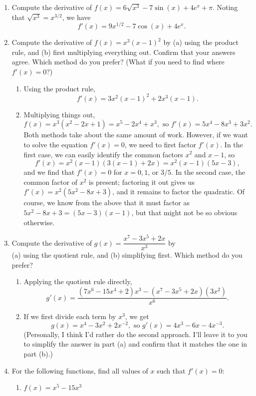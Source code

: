 \documentclass[12pt]{article}
\begin{document}
\begin{enumerate}
    \item Compute the derivative of $f(x) = 6\sqrt{x^3}-7\sin(x)+4e^x +\pi.$
    Noting that $\sqrt{x^3} = x^{3/2}$, we have
    \[
    f'(x) = 9x^{1/2}-7\cos(x)+4e^x.
    \]
    
    
    
    \item Compute the derivative of $f(x)=x^3(x-1)^2$ by (a) using the product rule, and (b) first multiplying everything out. Confirm that your answers agree. Which method do you prefer? (What if you need to find where $f'(x)=0$?)
    
   \begin{enumerate}
   \item Using the product rule,
   \[
   f'(x) = 3x^2(x-1)^2+2x^3(x-1).
   \]
   \item Multiplying things out,
   \[
   f(x) = x^3(x^2-2x+1)=x^5-2x^4+x^3, \text{ so } f'(x) = 5x^4-8x^3+3x^2.
   \]
   Both methods take about the same amount of work. However, if we want to solve the equation $f'(x)=0$, we need to first factor $f'(x)$. In the first case, we can easily identify the common factors $x^2$ and $x-1$, so
   \[
   f'(x) = x^2(x-1)(3(x-1)+2x) = x^2(x-1)(5x-3),
   \]
   and we find that $f'(x)=0$ for $x=0, 1$, or $3/5$.
   In the second case, the common factor of $x^2$ is present; factoring it out gives us $f'(x) = x^2(5x^2-8x+3)$, and it remains to factor the quadratic. Of course, we know from the above that it must factor as $5x^2-8x+3=(5x-3)(x-1)$, but that might not be so obvious otherwise.
   \end{enumerate}
    
    \item Compute the derivative of $g(x) = \dfrac{x^7-3x^5+2x}{x^3}$ by\\ (a) using the quotient rule, and (b) simplifying first. Which method do you prefer?
    
\begin{enumerate}
\item Applying the quotient rule directly,
\[
g'(x) = \dfrac{(7x^6-15x^4+2)x^3-(x^7-3x^5+2x)(3x^2)}{x^6}.
\]
\item If we first divide each term by $x^3$, we get
\[
g(x) =x^4-3x^2+2x^{-2}, \text{ so } g'(x) = 4x^3-6x-4x^{-3}.
\]
(Personally, I think I'd rather do the second approach. I'll leave it to you to simplify the answer in part (a) and confirm that it matches the one in part (b).)
\end{enumerate}
    
    \item For the following functions, find all values of $x$ such that $f'(x)=0$:
    \begin{enumerate}
    \item $f(x) = x^5-15x^3$


\end{enumerate}
\end{enumerate}
\end{document}
